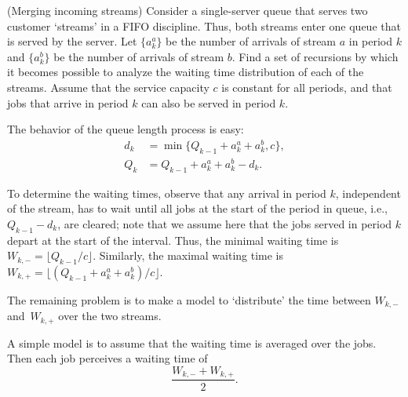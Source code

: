 \begin{exercise} (Merging incoming streams) 
Consider a   single-server queue that serves two customer `streams' in a FIFO
  discipline. Thus, both streams enter one queue that is served by the
  server. Let $\{a_k^a\}$ be the number of arrivals of stream $a$ in
  period $k$ and $\{a_k^b\}$ be the number of arrivals of stream
  $b$. Find a set of recursions by which it becomes possible to
  analyze the waiting time distribution of each of the streams. Assume
  that the service capacity $c$ is constant for all periods, and that
  jobs that arrive in period $k$ can also be served in period $k$.
  \begin{solution}
    The behavior of the queue length  process is easy: 
    \begin{equation*}
      \begin{split}
      d_k &= \min\{Q_{k-1}+a_k^a+a_k^b, c\}, \\
Q_k &= Q_{k-1}+a_k^a + a_k^b - d_k.
      \end{split}
    \end{equation*}

    To determine the waiting times, observe that any arrival in period
    $k$, independent of the stream, has to wait until all jobs at the
    start of the period in queue, i.e., $Q_{k-1}-d_k$, are cleared;
    note that we assume here that the jobs served in period $k$ depart
    at the start of the interval. Thus, the minimal waiting time is
    $W_{k,-} = \lfloor Q_{k-1}/c\rfloor$.  Similarly, the maximal
    waiting time is
    $W_{k,+} = \lfloor (Q_{k-1}+a_k^a + a_k^b) /c\rfloor$.

    The remaining problem is to make a model to `distribute' the
    time between $W_{k,-}$ and~$W_{k,+}$ over the two streams. 

    A simple model is to assume that the waiting time is averaged over
    the jobs. Then each job perceives a waiting time of
    \begin{equation*}
      \frac{W_{k,-} + W_{k,+}}2.
    \end{equation*}


\end{solution}
\end{exercise}
